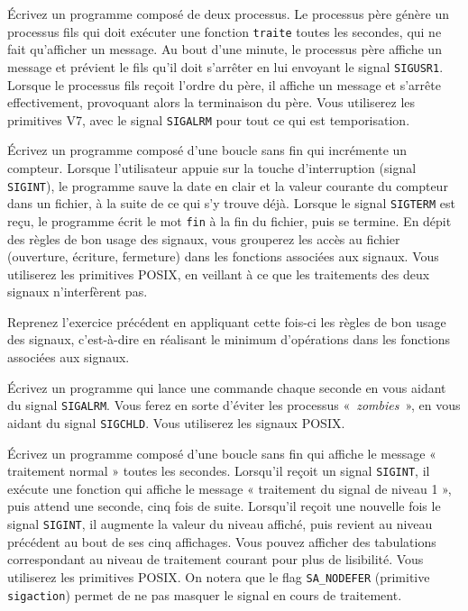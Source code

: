 \question

Écrivez un programme composé de deux processus.  Le processus père
génère un processus fils qui doit exécuter une fonction {\tt traite}
toutes les secondes, qui ne fait qu'afficher un message.  Au bout d'une
minute, le processus père affiche un message et prévient le fils qu'il
doit s'arrêter en lui envoyant le signal \texttt {SIGUSR1}. Lorsque
le processus fils reçoit l'ordre du père, il affiche un message et
s'arrête effectivement, provoquant alors la terminaison du père. Vous
utiliserez les primitives V7, avec le signal \texttt {SIGALRM} pour tout
ce qui est temporisation.


\question

Écrivez un programme composé d'une boucle sans fin qui
incrémente un compteur. Lorsque l'utilisateur appuie sur la touche
d'interruption (signal {\tt SIGINT}), le programme sauve la date en
clair et la valeur courante du compteur dans un fichier,
à la suite de ce qui s'y trouve déjà.
Lorsque le signal {\tt SIGTERM} est reçu, le programme écrit
le mot {\tt fin} à la fin du fichier, puis se termine.
En dépit des règles de bon usage des signaux, vous grouperez les accès
au fichier (ouverture, écriture, fermeture) dans les fonctions associées
aux signaux.  Vous utiliserez les primitives POSIX, en veillant à ce
que les traitements des deux signaux n'interfèrent pas.


\question

Reprenez l'exercice précédent en appliquant cette fois-ci les règles
de bon usage des signaux, c'est-à-dire en réalisant le minimum
d'opérations dans les fonctions associées aux signaux.


\question

Écrivez un programme qui lance une commande chaque seconde en vous aidant
du signal \texttt {SIGALRM}. Vous ferez en sorte d'éviter les processus
«~\textit {zombies}~», en vous aidant du signal \texttt {SIGCHLD}.
Vous utiliserez les signaux POSIX.


\question

Écrivez un programme composé d'une boucle sans fin qui affiche le
message « traitement normal » toutes les secondes. Lorsqu'il reçoit un
signal {\tt SIGINT}, il exécute une fonction qui affiche le message
« traitement du signal de niveau 1 », puis attend une seconde, cinq
fois de suite. Lorsqu'il reçoit une nouvelle fois le signal \texttt
{SIGINT}, il augmente la valeur du niveau affiché, puis revient au
niveau précédent au bout de ses cinq affichages. Vous pouvez afficher
des tabulations correspondant au niveau de traitement courant pour plus
de lisibilité. Vous utiliserez les primitives POSIX. On notera que le
flag \texttt {SA\_NODEFER} (primitive \texttt {sigaction}) permet de ne
pas masquer le signal en cours de traitement.


